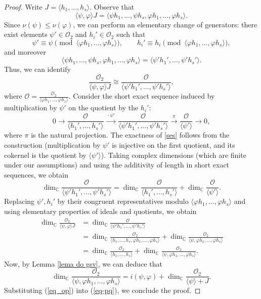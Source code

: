 \documentclass[12pt,letterpaper]{amsart}
\newcommand{\C}{\mathbb{C}}
\begin{document}
\begin{proof}
Write $J=\langle h_1,\dots,h_s\rangle$. Observe that
\[
\langle\psi,\varphi\rangle J=\langle\psi h_1,\dots,\psi h_s,\varphi h_1,\dots,\varphi h_s\rangle.
\]
Since $\nu(\psi)\leq\nu(\varphi)$, we can perform an elementary change of generators: there exist elements $\psi'\in\mathcal{O}_2$ and $h_i'\in\mathcal{O}_2$ such that
\[\psi'\equiv\psi\pmod{\langle\varphi h_1,\dots,\varphi h_s\rangle},\qquad h_i'\equiv h_i\pmod{\langle\varphi h_1,\dots,\varphi h_s\rangle},\]
and moreover
\[
\langle\psi h_1,\dots,\psi h_s,\varphi h_1,\dots,\varphi h_s\rangle=\langle\psi' h_1',\dots,\psi' h_s'\rangle.
\]
Thus, we can identify
\[
\frac{\mathcal{O}_2}{\langle\psi,\varphi\rangle J}\cong\frac{\mathcal{O}}{\langle\psi' h_1',\dots,\psi' h_s'\rangle},
\]
where $\mathcal{O}=\frac{\mathcal{O}_2}{\langle\varphi h_1,\dots,\varphi h_s\rangle}$.
Consider the short exact sequence induced by multiplication by $\psi'$ on the quotient by the $h_i'$:
\begin{equation}\label{ses}
0\longrightarrow\frac{\mathcal{O}}{\langle h_1',\dots,h_s'\rangle} \xrightarrow{\ \cdot\psi'\ } \frac{\mathcal{O}}{\langle\psi' h_1',\dots,\psi' h_s'\rangle} \xrightarrow{\ \pi\ } \frac{\mathcal{O}}{\langle\psi'\rangle}\longrightarrow 0,
\end{equation}
where $\pi$ is the natural projection. The exactness of \eqref{ses} follows from the construction (multiplication by $\psi'$ is injective on the first quotient, and its cokernel is the quotient by $\langle\psi'\rangle$).
Taking complex dimensions (which are finite under our assumptions) and using the additivity of length in short exact sequences, we obtain
\begin{equation*}\label{add}
\dim_\mathbb{C}\frac{\mathcal{O}}{\langle\psi' h_1',\dots,\psi' h_s'\rangle}=\dim_\mathbb{C}\frac{\mathcal{O}}{\langle h_1',\dots,h_s'\rangle}+\dim_\mathbb{C}\frac{\mathcal{O}}{\langle\psi'\rangle}.
\end{equation*}
Replacing $\psi',h_i'$ by their congruent representatives modulo $\langle\varphi h_1,\dots,\varphi h_s\rangle$ and using elementary properties of ideals and quotients, we obtain
\begin{align}\label{eq-pq}
\dim_\mathbb{C}\frac{\mathcal{O}_2}{\langle\psi,\varphi\rangle J} &= \dim_\mathbb{C}\frac{\mathcal{O}}{\langle\psi' h_1',\dots,\psi' h_s'\rangle} \nonumber\\
&= \dim_\mathbb{C}\frac{\mathcal{O}_2}{\langle h_1,\dots,h_s,\varphi h_1,\ldots,\varphi h_s\rangle}+\dim_\mathbb{C}\frac{\mathcal{O}_2}{\langle\psi,\varphi h_1,\ldots,\varphi h_s\rangle}\nonumber\\
&= \dim_\mathbb{C}\frac{\mathcal{O}_2}{\langle h_1,\dots,h_s\rangle} + \dim_\mathbb{C}\frac{\mathcal{O}_2}{\langle\psi,\varphi h_1,\ldots,\varphi h_s\rangle}.
\end{align}
Now, by Lemma \ref{lema do gsv}, we can deduce that 
\begin{equation}\label{eq_op}
\dim_\mathbb{C}\frac{\mathcal{O}_2}{\langle\psi,\varphi h_1,\ldots,\varphi h_s\rangle}=i(\psi,\varphi)+\dim_\C\frac{\mathcal{O}_2}{\langle \psi\rangle+J}.
\end{equation}
Substituting (\ref{eq_op}) into (\ref{eq-pq}), we conclude the proof. 
\end{proof}
\end{document}
